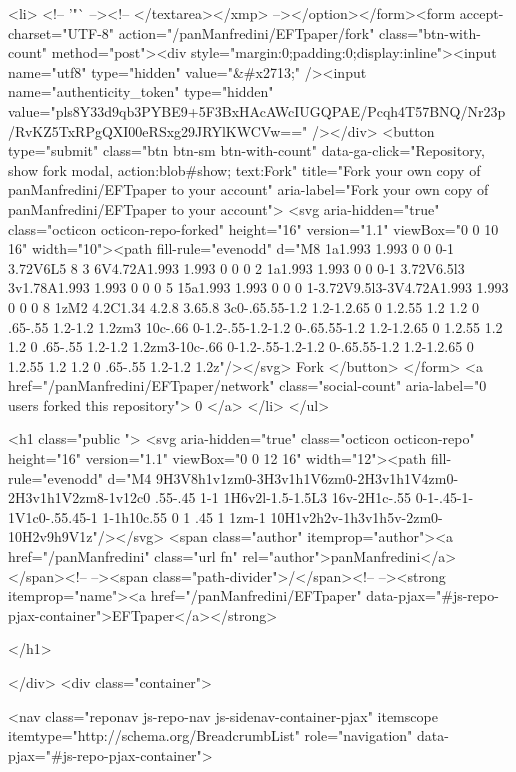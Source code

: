   <li>
          <!-- '"` --><!-- </textarea></xmp> --></option></form><form accept-charset="UTF-8" action="/panManfredini/EFTpaper/fork" class="btn-with-count" method="post"><div style="margin:0;padding:0;display:inline"><input name="utf8" type="hidden" value="&#x2713;" /><input name="authenticity_token" type="hidden" value="pls8Y33d9qb3PYBE9+5F3BxHAcAWcIUGQPAE/Pcqh4T57BNQ/Nr23p/RvKZ5TxRPgQXI00eRSxg29JRYlKWCVw==" /></div>
            <button
                type="submit"
                class="btn btn-sm btn-with-count"
                data-ga-click="Repository, show fork modal, action:blob#show; text:Fork"
                title="Fork your own copy of panManfredini/EFTpaper to your account"
                aria-label="Fork your own copy of panManfredini/EFTpaper to your account">
              <svg aria-hidden="true" class="octicon octicon-repo-forked" height="16" version="1.1" viewBox="0 0 10 16" width="10"><path fill-rule="evenodd" d="M8 1a1.993 1.993 0 0 0-1 3.72V6L5 8 3 6V4.72A1.993 1.993 0 0 0 2 1a1.993 1.993 0 0 0-1 3.72V6.5l3 3v1.78A1.993 1.993 0 0 0 5 15a1.993 1.993 0 0 0 1-3.72V9.5l3-3V4.72A1.993 1.993 0 0 0 8 1zM2 4.2C1.34 4.2.8 3.65.8 3c0-.65.55-1.2 1.2-1.2.65 0 1.2.55 1.2 1.2 0 .65-.55 1.2-1.2 1.2zm3 10c-.66 0-1.2-.55-1.2-1.2 0-.65.55-1.2 1.2-1.2.65 0 1.2.55 1.2 1.2 0 .65-.55 1.2-1.2 1.2zm3-10c-.66 0-1.2-.55-1.2-1.2 0-.65.55-1.2 1.2-1.2.65 0 1.2.55 1.2 1.2 0 .65-.55 1.2-1.2 1.2z"/></svg>
              Fork
            </button>
</form>
    <a href="/panManfredini/EFTpaper/network" class="social-count"
       aria-label="0 users forked this repository">
      0
    </a>
  </li>
</ul>

      <h1 class="public ">
  <svg aria-hidden="true" class="octicon octicon-repo" height="16" version="1.1" viewBox="0 0 12 16" width="12"><path fill-rule="evenodd" d="M4 9H3V8h1v1zm0-3H3v1h1V6zm0-2H3v1h1V4zm0-2H3v1h1V2zm8-1v12c0 .55-.45 1-1 1H6v2l-1.5-1.5L3 16v-2H1c-.55 0-1-.45-1-1V1c0-.55.45-1 1-1h10c.55 0 1 .45 1 1zm-1 10H1v2h2v-1h3v1h5v-2zm0-10H2v9h9V1z"/></svg>
  <span class="author" itemprop="author"><a href="/panManfredini" class="url fn" rel="author">panManfredini</a></span><!--
--><span class="path-divider">/</span><!--
--><strong itemprop="name"><a href="/panManfredini/EFTpaper" data-pjax="#js-repo-pjax-container">EFTpaper</a></strong>

</h1>

    </div>
    <div class="container">
      
<nav class="reponav js-repo-nav js-sidenav-container-pjax"
     itemscope
     itemtype="http://schema.org/BreadcrumbList"
     role="navigation"
     data-pjax="#js-repo-pjax-container">


